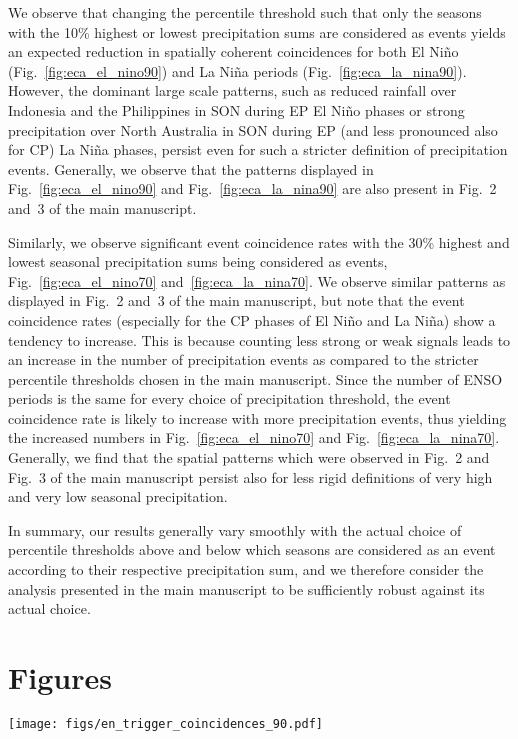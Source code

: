 We observe that changing the percentile threshold such that only the seasons with the 10\% highest or lowest precipitation sums are considered as events yields an expected reduction in spatially coherent coincidences for both El Ni\~no (Fig.~\ref{fig:eca_el_nino90}) and La Ni\~na periods (Fig.~\ref{fig:eca_la_nina90}). However, the dominant large scale patterns, such as reduced rainfall over Indonesia and the Philippines in SON during EP El Ni\~no phases or strong precipitation over North Australia in SON during EP (and less pronounced also for CP) La Ni\~na phases, persist even for such a stricter definition of precipitation events. Generally, we observe that the patterns displayed in Fig.~\ref{fig:eca_el_nino90} and Fig.~\ref{fig:eca_la_nina90} are also present in Fig.\ 2 and\ 3 of the main manuscript.

Similarly, we observe significant event coincidence rates with the 30\% highest and lowest seasonal precipitation sums being considered as events, Fig.~\ref{fig:eca_el_nino70} and~\ref{fig:eca_la_nina70}. We observe similar patterns as displayed in Fig.\ 2 and\ 3 of the main manuscript, but note that the event coincidence rates (especially for the CP phases of El Ni\~no and La Ni\~na) show a tendency to increase. This is because counting less strong or weak signals leads to an increase in the number of precipitation events as compared to the stricter percentile thresholds chosen in the main manuscript. Since the number of ENSO periods is the same for every choice of precipitation threshold, the event coincidence rate is likely to increase with more precipitation events, thus yielding the increased numbers in Fig.~\ref{fig:eca_el_nino70} and Fig.~\ref{fig:eca_la_nina70}. Generally, we find that the spatial patterns which were observed in Fig.\ 2 and Fig.\ 3 of the main manuscript persist also for less rigid definitions of very high and very low seasonal precipitation. 

In summary, our results generally vary smoothly with the actual choice of percentile thresholds above and below which seasons are considered as an event according to their respective precipitation sum, and we therefore consider the analysis presented in the main manuscript to be sufficiently robust against its actual choice. 

\section{Figures}
\begin{figure*}[t]
  \centering
  \texttt{[image: figs/en\_trigger\_coincidences\_90.pdf]}
  \caption{Same as Fig.\ 3 of the main manuscript but for strong (weak) precipitation
    events defined as values that exceed (fall below) the 90th (10th) percentile of each
    individual time series.}    
  \label{fig:eca_el_nino90}
\end{figure*}

